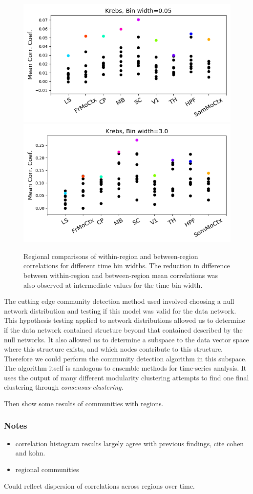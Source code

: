 \documentclass[a4paper,12pt]{article}
\theoremstyle{definition}
\begin{document}
\begin{figure}[t!]
    \centering
    \includegraphics[width=0.45\columnwidth]{images/Krebs_0p05_corr_comp.png}
    \includegraphics[width=0.45\columnwidth]{images/Krebs_3p0_corr_comp.png}
    \caption{Regional comparisons of within-region and between-region correlations for different time bin widths. The reduction in difference between within-region and between-region mean correlations was also observed at intermediate values for the time bin width.}
    \label{fig:within_between}
\end{figure}

The cutting edge community detection method used involved choosing a null network distribution and testing if this model was valid for the data network. This hypothesis testing applied to network distributions allowed us to determine if the data network contained structure beyond that contained described by the null networks. It also allowed us to determine a subspace to the data vector space where this structure exists, and which nodes contribute to this structure. Therefore we could perform the community detection algorithm in this subspace. The algorithm itself is analogous to ensemble methods for time-series analysis. It uses the output of many different modularity clustering attempts to find one final clustering through \textit{consensus-clustering}.


Then show some results of communities with regions.

\subsubsection*{Notes}
\begin{itemize}
  \item correlation histogram results largely agree with previous findings, cite cohen and kohn.

  \item regional communities 
\end{itemize}

Could reflect dispersion of correlations across regions over time.


\end{document}
